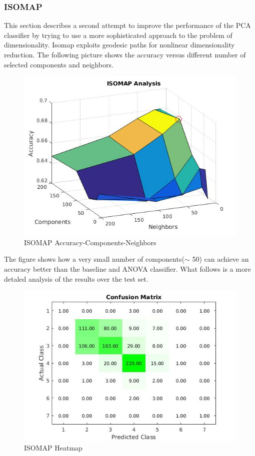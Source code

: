 \documentclass[a4paper,10pt]{article}
\begin{document}
     \subsubsection{ISOMAP}
      This section describes a second attempt to improve the performance of the PCA classifier by trying to use a more 
      sophisticated approach to the problem of dimensionality. 
      Isomap exploits geodesic paths for nonlinear dimensionality reduction.\newline
      The following picture shows the accuracy versus different number of selected components and neighbors.
      \begin{figure}[H]
	\centering
	\includegraphics[scale=0.5]{iso-acc.jpg}
	\caption{ISOMAP Accuracy-Components-Neighbors}
      \end{figure}
      \noindent The figure shows how a very small number of components($\sim$ 50) 
      can achieve an accuracy better than the baseline and ANOVA classifier.\newline
      What follows is a more detaled analysis of the results over the test set.
      \begin{figure}[H]
	\centering
	\includegraphics[scale=0.5]{iso-heat.jpg}
	\caption{ISOMAP Heatmap}
      \end{figure}
\end{document}
